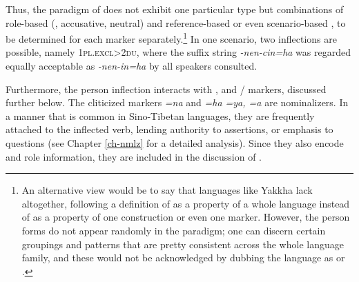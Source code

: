 Thus, the paradigm of  does not exhibit one particular  type but combinations of role-based (, accusative, neutral) and reference-based or even scenario-based , to be determined for each marker separately.\footnote{An alternative view would be to say that languages like Yakkha lack  altogether, following a definition of  as a property of a whole language instead of as a property of one construction or even one marker. However, the person forms do not appear randomly in the paradigm; one can discern certain groupings and patterns that are pretty consistent across the whole language family, and these would not be acknowledged by dubbing the language as  or .} In one scenario, two inflections are possible, namely {\scshape 1pl.excl>2du}, where the suffix string \emph{-nen-cin=ha} was regarded equally acceptable as \emph{-nen-in=ha} by all speakers consulted. 
 
 Furthermore, the person inflection interacts with ,  and / markers, discussed further below. The cliticized markers  \emph{=na} and \emph{=ha \ti =ya, \ti =a} are nominalizers. In a manner that is common in Sino-Tibetan languages, they are frequently attached to the inflected verb, lending authority to assertions, or emphasis to questions (see Chapter \ref{ch-nmlz} for a detailed analysis). Since they also encode  and role information, they are included in the discussion of . 

